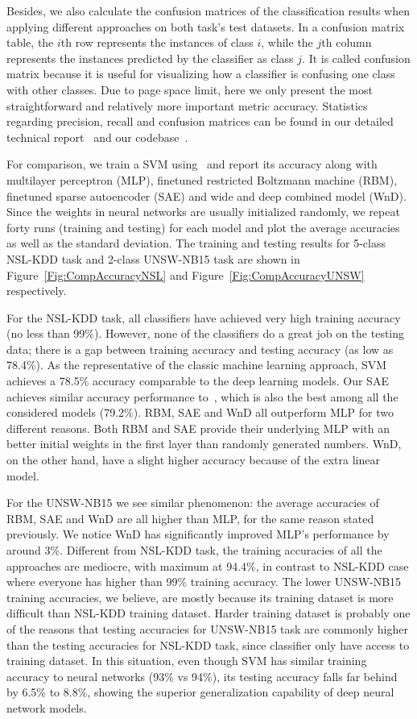 Besides, we also calculate the confusion matrices of the classification results when applying
different approaches on both task's test datasets.
In a confusion matrix table, the $i$th row represents the instances of class $i$,
while the $j$th column represents the instances predicted by the classifier as class $j$.
It is called confusion matrix because it is useful for visualizing how a classifier
is confusing one class with other classes.
Due to page space limit, here we only present the most straightforward
and relatively more important metric accuracy.
Statistics regarding precision, recall and confusion matrices can be found
in our detailed technical report~\cite{OurWonReport} and our codebase~\cite{NetLearner}.

For comparison, we train a SVM using~\cite{ScikitLearnSVM} and report its accuracy along
with multilayer perceptron (MLP), finetuned restricted Boltzmann machine (RBM),
finetuned sparse autoencoder (SAE) and wide and deep combined model (WnD).
Since the weights in neural networks are usually initialized randomly, we repeat forty
runs (training and testing) for each model and plot the average accuracies as well as the standard deviation.
The training and testing results for 5-class NSL-KDD task and 2-class UNSW-NB15 task are
shown in Figure~\ref{Fig:CompAccuracyNSL} and Figure~\ref{Fig:CompAccuracyUNSW} respectively.

For the NSL-KDD task, all classifiers have achieved very high training accuracy (no less than 99\%).
However, none of the classifiers do a great job on the testing data;
there is a gap between training accuracy and testing accuracy (as low as 78.4\%).
As the representative of the classic machine learning approach, SVM achieves a 78.5\% accuracy
comparable to the deep learning models.
Our SAE achieves similar accuracy performance to~\cite{STL-NIDS}, which is
also the best among all the considered models (79.2\%).
RBM, SAE and WnD all outperform MLP for two different reasons.
Both RBM and SAE provide their underlying MLP with an better initial weights in the first layer
than randomly generated numbers.
WnD, on the other hand, have a slight higher accuracy because of the extra linear model.

For the UNSW-NB15 we see similar phenomenon: the average accuracies of RBM, SAE and WnD are
all higher than MLP, for the same reason stated previously.
We notice WnD has significantly improved MLP's performance by around 3\%.
Different from NSL-KDD task, the training accuracies of all the approaches are mediocre,
with maximum at 94.4\%, in contrast to NSL-KDD case where everyone has higher than 99\% training accuracy.
The lower UNSW-NB15 training accuracies, we believe, are mostly because its training dataset
is more difficult than NSL-KDD training dataset.
Harder training dataset is probably one of the reasons that testing accuracies for UNSW-NB15 task
are commonly higher than the testing accuracies for NSL-KDD task,
since classifier only have access to training dataset.
In this situation, even though SVM has similar training accuracy to neural networks (93\% vs 94\%),
its testing accuracy falls far behind by 6.5\% to 8.8\%,
showing the superior generalization capability of deep neural network models.

